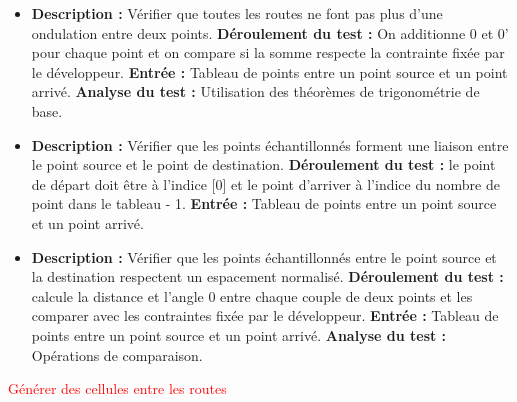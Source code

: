{
\begin{itemize}

\item \textbf{\tab Description : } Vérifier que toutes les routes ne font pas plus d’une ondulation entre deux points.\newline
\textbf{\tab Déroulement du test : } On additionne 0 et 0’ pour chaque point et on compare si la somme respecte la contrainte fixée par le développeur.\newline
\textbf{\tab Entrée : } Tableau de points entre un point source et un point arrivé.\newline
\textbf{\tab Analyse du test : } Utilisation des théorèmes de trigonométrie de base.

\item \textbf{\tab Description : } Vérifier que les points échantillonnés forment une liaison entre le point source et le point de destination.\newline
\textbf{\tab Déroulement du test : } le point de départ doit être à l’indice [0] et le point d’arriver à l'indice du nombre de point dans le tableau - 1.\newline
\textbf{\tab Entrée : } Tableau de points entre un point source et un point arrivé.

\item \textbf{\tab Description : } Vérifier que les points échantillonnés entre le point source et la destination respectent un espacement normalisé.\newline
\textbf{\tab Déroulement du test : } calcule la distance et l’angle 0 entre chaque couple de deux points et les comparer avec les contraintes fixée par le développeur.\newline
\textbf{\tab Entrée : }  Tableau de points entre un point source et un point arrivé.\newline
\textbf{\tab Analyse du test : } Opérations de comparaison.

\end{itemize}
}
\besoin{}
{\textcolor{red}{Générer des cellules entre les routes}}
